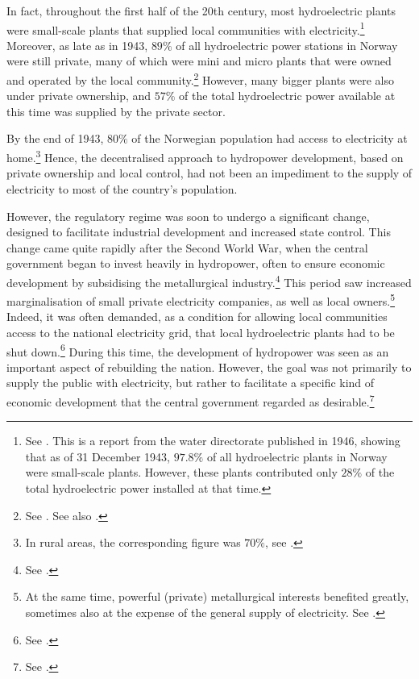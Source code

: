 In fact, throughout the first half of the 20th century, most hydroelectric plants were small-scale plants that supplied local communities with electricity.\footnote{See \cite[11]{utbygd46}. This is a report from the water directorate published in 1946, showing that as of 31 December 1943, $97.8 \%$ of all hydroelectric plants in Norway were small-scale plants. However, these plants contributed only $28 \%$ of the total hydroelectric power installed at that time.} Moreover, as late as in 1943, $89 \%$ of all hydroelectric power stations in Norway were still private, many of which were mini and micro plants that were owned and operated by the local community.\footnote{See \cite[6]{utbygd46}. See also \cite[111]{hindrum94}.} However, many bigger plants were also under private ownership, and $57 \%$ of the total hydroelectric power available at this time was supplied by the private sector. 

By the end of 1943, $80 \%$ of the Norwegian population had access to electricity at home.\footnote{In rural areas, the corresponding figure was $70 \%$, see \cite[7]{utbygd46}.} Hence, the decentralised approach to hydropower development, based on private ownership and local control, had not been an impediment to the supply of electricity to most of the country's population.

However, the regulatory regime was soon to undergo a significant change, designed to facilitate industrial development and increased state control. This change came quite rapidly after the Second World War, when the central government began to invest heavily in hydropower, often to ensure economic development by subsidising the metallurgical industry.\footnote{See \cite[59-65]{thue96}.} This period saw increased marginalisation of small private electricity companies, as well as local owners.\footnote{At the same time, powerful (private) metallurgical interests benefited greatly, sometimes also at the expense of the general supply of electricity. See \cite[65-71]{thue96}.} Indeed, it was often demanded, as a condition for allowing local communities access to the national electricity grid, that local hydroelectric plants had to be shut down.\footnote{See \cite[111]{hindrum94}.} During this time, the development of hydropower was seen as an important aspect of rebuilding the nation. However, the goal was not primarily to supply the public with electricity, but rather to facilitate a specific kind of economic development that the central government regarded as desirable.\footnote{See \cite[59]{thue96}.}

